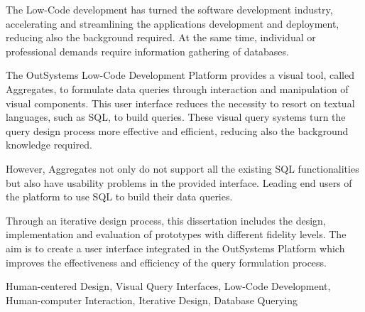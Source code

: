 The Low-Code development has turned the software development industry, accelerating and streamlining the applications development and deployment, reducing also the background required. At the same time, individual or professional demands require information gathering of databases.

The OutSystems Low-Code Development Platform provides a visual tool, called Aggregates, to formulate data queries through interaction and manipulation of visual components. This user interface reduces the necessity to resort on textual languages, such as SQL, to build queries. These visual query systems turn the query design process more effective and efficient, reducing also the background knowledge required.

However, Aggregates not only do not support all the existing SQL functionalities but also have usability problems in the provided interface. Leading end users of the platform to use SQL to build their data queries.

Through an iterative design process, this dissertation includes the design, implementation and evaluation of prototypes with different fidelity levels. The aim is to create a user interface integrated in the OutSystems Platform which improves the effectiveness and efficiency of the query formulation process.


\begin{keywords}
Human-centered Design, Visual Query Interfaces, Low-Code Development, Human-computer Interaction, Iterative Design, Database Querying
\end{keywords} 
